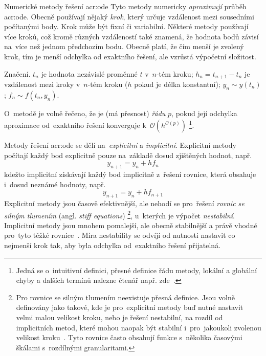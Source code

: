\documentclass[thesis=M,czech]{FITthesis}[2012/06/26]
\newcommand{\acrlabel}[1]{acr:#1}
\newcommand{\acr}[1]{\acrshort{\acrlabel{#1}}}
\newcommand{\hl}[1]{\textit{#1}}
\newcommand{\name}[1]{\hl{#1}}
\newcommand{\cit}[1]{\cite{#1}}
\newcommand{\set}[1]{\ensuremath{\mathcal{#1}}}
\begin{document}
\begin{section}{Numerické metody řešení \acr{ode}}\label{s:search:ode}
Tyto metody numericky \hl{aproximují} průběh \acr{ode}.
Obecně používají nějaký \name{krok},
který určuje vzdálenost mezi sousedními počítanými body.
Krok může být fixní či variabilní.
Některé metody používají více kroků,
což kromě různých vzdáleností také znamená,
že hodnota bodů závisí na~více než jednom předchozím bodu.
Obecně platí, že čím menší je zvolený krok,
tím je menší odchylka od exaktního řešení,
ale vzrůstá výpočetní složitost.


\begin{paragraph}{Značení.}\label{p:search:ode:sign}
$t_n$ je hodnota nezávislé proměnné $t$ v~$n$-tém kroku;
$h_n = {t_{n+1} - t_{n}}$ je vzdálenost mezi kroky v~$n$-tém kroku
($h$ pokud je délka konstantní);
${y_n \sim y(t_n)}$;
${f_n \sim f(t_n, y_n)}$.

O~metodě je volně řečeno, že je (má přesnost) \name{řádu} $p$,
pokud její odchylka aproximace od~exaktního řešení
konverguje k~${\set{O}( h^{\set{O}(p)} )}$\:%
\footnote{Jedná se o~intuitivní definici,
přesné definice řádu metody,
lokální a globální chyby a dalších termínů
nalezne čtenář např. zde~\cit{ode-nsolve-intro}.}.
\end{paragraph} %


\bigskip

Metody řešení \acr{ode} se dělí
na~\name{explicitní} a \name{implicitní}.
Explicitní metody počítají každý bod explicitně
pouze na~základě dosud zjištěných hodnot, např.
\begin{equation}\label{eq:ode:explicit}
   y_{n+1} = y_n + h f_n
\end{equation}
kdežto implicitní získávají každý bod implicitně z~řešení rovnice,
která obsahuje i~dosud neznámé hodnoty, např.
\begin{equation}\label{eq:ode:implicit}
   y_{n+1} = y_{n} + h f_{n+1}
\end{equation}
Explicitní metody jsou časově efektivnější,
ale nehodí se pro~řešení
\name{rovnic se silným tlumením} (angl. \name{stiff equations})%
\footnote{Pro rovnice se silným tlumením
neexistuje přesná definice.
Jsou volně definovány
jako takové, kde je pro~explicitní metody buď nutné nastavit
velmi malou velikost kroku,
nebo je řešení nestabilní,
na rozdíl od implicitních metod,
které mohou naopak být stabilní
i~pro~jakoukoli zvolenou
velikost kroku~\cit{ode-nsolve-intro}\cit{ode-nsolve}.
Tyto rovnice často obsahují funkce s~několika
časovými škálami s~rozdílnými granularitami.},
u~kterých je výpočet \hl{nestabilní}.
Implicitní metody jsou mnohem pomalejší, ale obecně stabilnější
a právě vhodné pro~tyto těžké rovnice~\cit{ode-nsolve-intro}.
Míra nestability se odvíjí od nutnosti nastavit co nejmenší krok tak,
aby byla odchylka od~exaktního řešení přijatelná.


\end{section}
\end{document}
